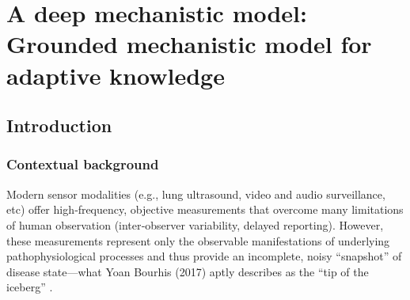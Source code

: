 
\chapter{A deep mechanistic model: Grounded mechanistic model for adaptive knowledge}
\section{Introduction}


\subsection{Contextual background}
Modern sensor modalities (e.g., lung ultrasound, video and audio surveillance, etc) offer high‑frequency, objective measurements that overcome many limitations of human observation (inter‑observer variability, delayed reporting). However, these measurements represent only the observable manifestations of underlying pathophysiological processes and thus provide an incomplete, noisy “snapshot” of disease state—what Yoan Bourhis (2017) aptly describes as the “tip of the iceberg” .

